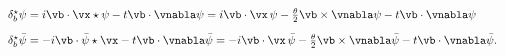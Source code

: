 \begin{equation}
     \begin{array}{ll}
     \delta^{\star}_{b}\psi=i\vb\cdot\vx\star\psi-t\vb\cdot\vnabla\psi
     =i\vb\cdot\vx\,\psi
     -\frac{\theta}{2}\vb\times\vnabla\psi-t\vb\cdot\vnabla\psi
     \\[10pt]
     \delta^{\star}_{b}\bar{\psi}=
     -i\vb\cdot\bar{\psi}\star\vx-t\vb\cdot\vnabla\bar{\psi}
     =-i\vb\cdot\vx\,\bar{\psi}
     -\frac{\theta}{2}\vb\times\vnabla\bar{\psi}
     -t\vb\cdot\vnabla\bar{\psi}.
     \end{array}
     \label{ncbimp}
\end{equation}

